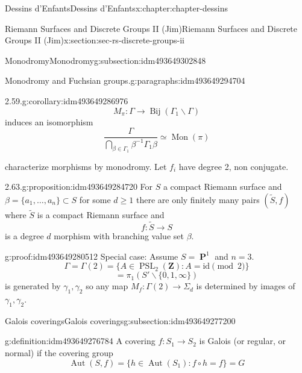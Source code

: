 \documentclass[oneside,10pt,]{book}
\numberwithin{equation}{section}
\newcommand{\inv}{^{-1}}
\newcommand{\ZZ}{\mathbf{Z}}
\newcommand{\id}{\mathrm{id}}
\DeclareMathOperator{\PP}{\mathbf{P}}
\DeclareMathOperator{\Aut}{Aut}
\DeclareMathOperator{\PSL}{PSL}
\begin{document}
\begin{chapterptx}{Dessins d'Enfants}{}{Dessins d'Enfants}{}{}{x:chapter:chapter-dessins}
\begin{sectionptx}{Riemann Surfaces and Discrete Groups II (Jim)}{}{Riemann Surfaces and Discrete Groups II (Jim)}{}{}{x:section:sec-rs-discrete-groups-ii}
\begin{subsectionptx}{Monodromy}{}{Monodromy}{}{}{g:subsection:idm493649302848}
\begin{paragraphs}{Monodromy and Fuchsian groups.}{g:paragraphs:idm493649294704}
\begin{corollary}{2.59.}{}{g:corollary:idm493649286976}%
%
\begin{equation*}
M_\pi \colon \Gamma \to \operatorname{Bij} (\Gamma_1 \backslash \Gamma)
\end{equation*}
induces an isomorphism%
\begin{equation*}
\frac{\Gamma}{\bigcap_{\beta\in \Gamma_1} \beta\inv \Gamma_1 \beta} \simeq \operatorname{Mon}(\pi)
\end{equation*}
%
\end{corollary}
characterize morphisms by monodromy. Let \(f_i\) have degree 2, non conjugate.%
\begin{proposition}{2.63.}{}{g:proposition:idm493649284720}%
For \(S\) a compact Riemann surface and \(\beta = \{ a_1, \ldots, a_n\} \subset S\) for some \(d \ge 1\) there are only finitely many pairs \((\tilde S, f)\) where \(\tilde S\) is a compact Riemann surface and%
\begin{equation*}
f\colon \tilde S \to S
\end{equation*}
is a degree \(d\) morphism with branching  value set \(\beta\).%
\end{proposition}
\begin{proofptx}{}{g:proof:idm493649280512}
Special case: Assume \(S = \PP^1\) and \(n=3\).%
\begin{equation*}
\Gamma = \Gamma(2) = \{ A \in \PSL_2(\ZZ) : A = \id \pmod 2\}
\end{equation*}
%
\begin{equation*}
= \pi_1 (S' \smallsetminus \{0,1,\infty\})
\end{equation*}
is generated by \(\gamma_1, \gamma_2\) so any map \(M_f \colon \Gamma(2) \to \Sigma_d\) is determined by  images of \(\gamma_1, \gamma_2\).%
\end{proofptx}
\end{paragraphs}%
\end{subsectionptx}
%
%
\typeout{************************************************}
\typeout{************************************************}
%
\begin{subsectionptx}{Galois coverings}{}{Galois coverings}{}{}{g:subsection:idm493649277200}
\begin{definition}{}{g:definition:idm493649276784}%
A covering \(f\colon S_1\to S_2\) is Galois (or regular, or normal) if the covering group%
\begin{equation*}
\Aut(S,f) =  \{ h\in \Aut(S_1) : f\circ h= f\} = G

\end{equation*}
\end{definition}
\end{subsectionptx}
\end{sectionptx}
\end{chapterptx}
\end{document}
